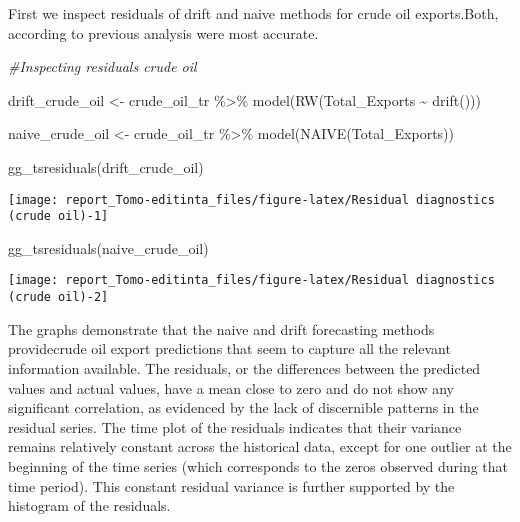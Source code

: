 \documentclass[
]{article}
\newenvironment{Shaded}{\begin{snugshade}}{\end{snugshade}}
\newcommand{\CommentTok}[1]{\textcolor[rgb]{0.56,0.35,0.01}{\textit{#1}}}
\newcommand{\FunctionTok}[1]{\textcolor[rgb]{0.00,0.00,0.00}{#1}}
\newcommand{\NormalTok}[1]{#1}
\newcommand{\OtherTok}[1]{\textcolor[rgb]{0.56,0.35,0.01}{#1}}
\newcommand{\SpecialCharTok}[1]{\textcolor[rgb]{0.00,0.00,0.00}{#1}}
\begin{document}
First we inspect residuals of drift and naive methods for crude oil
exports.Both, according to previous analysis were most accurate.

\begin{Shaded}
\begin{Highlighting}[]
\CommentTok{\#Inspecting residuals crude oil}

\NormalTok{drift\_crude\_oil }\OtherTok{\textless{}{-}}\NormalTok{ crude\_oil\_tr }\SpecialCharTok{\%\textgreater{}\%} 
  \FunctionTok{model}\NormalTok{(}\FunctionTok{RW}\NormalTok{(Total\_Exports }\SpecialCharTok{\textasciitilde{}} \FunctionTok{drift}\NormalTok{()))}

\NormalTok{naive\_crude\_oil }\OtherTok{\textless{}{-}}\NormalTok{ crude\_oil\_tr }\SpecialCharTok{\%\textgreater{}\%} 
  \FunctionTok{model}\NormalTok{(}\FunctionTok{NAIVE}\NormalTok{(Total\_Exports))}

\FunctionTok{gg\_tsresiduals}\NormalTok{(drift\_crude\_oil)}
\end{Highlighting}
\end{Shaded}

\begin{center}\texttt{[image: report\_Tomo-editinta\_files/figure-latex/Residual diagnostics (crude oil)-1]} \end{center}

\begin{Shaded}
\begin{Highlighting}[]
\FunctionTok{gg\_tsresiduals}\NormalTok{(naive\_crude\_oil)}
\end{Highlighting}
\end{Shaded}

\begin{center}\texttt{[image: report\_Tomo-editinta\_files/figure-latex/Residual diagnostics (crude oil)-2]} \end{center}

The graphs demonstrate that the naive and drift forecasting methods
providecrude oil export predictions that seem to capture all the
relevant information available. The residuals, or the differences
between the predicted values and actual values, have a mean close to
zero and do not show any significant correlation, as evidenced by the
lack of discernible patterns in the residual series. The time plot of
the residuals indicates that their variance remains relatively constant
across the historical data, except for one outlier at the beginning of
the time series (which corresponds to the zeros observed during that
time period). This constant residual variance is further supported by
the histogram of the residuals.
\end{document}
